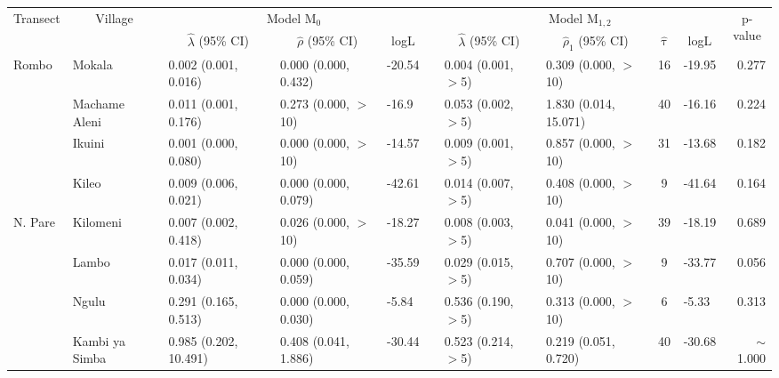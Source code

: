 \begin{tabular}{llllllllclr}
\toprule
\multicolumn{1}{c}{\multirow{2}{*}{Transect}} & \multicolumn{1}{c}{\multirow{2}{*}{Village}} & \multicolumn{3}{c}{Model M$_{0}$} & \multicolumn{1}{c}{} & \multicolumn{4}{c}{Model M$_{1,2}$} & \multicolumn{1}{c}{\multirow{2}{*}{p-value}}  \\ 
\cmidrule{3-5}\cmidrule{7-10}
\multicolumn{1}{c}{} & \multicolumn{1}{c}{} & \multicolumn{1}{c}{$\hat{\lambda}$ (95\% CI)} & \multicolumn{1}{c}{$\hat{\rho}$ (95\% CI)} & \multicolumn{1}{c}{logL} & \multicolumn{1}{c}{} & \multicolumn{1}{c}{$\hat{\lambda}$ (95\% CI)} & \multicolumn{1}{c}{$\hat{\rho}_1$ (95\% CI)} & \multicolumn{1}{c}{$\hat{\uptau}$} & \multicolumn{1}{c}{logL} & \multicolumn{1}{c}{} \\ 
\midrule
Rombo       & Mokala         & 0.002 (0.001, 0.016)   & 0.000 (0.000, 0.432)   & -20.54   & &   0.004 (0.001, $>$5)    & 0.309 (0.000, $>$10)   & 16   & -19.95  &  0.277  \\
            & Machame Aleni  & 0.011 (0.001, 0.176)   & 0.273 (0.000, $>$10)   & -16.9    & &   0.053 (0.002, $>$5)    & 1.830 (0.014, 15.071)  & 40   & -16.16  &  0.224  \\
            & Ikuini         & 0.001 (0.000, 0.080)   & 0.000 (0.000, $>$10)   & -14.57   & &   0.009 (0.001, $>$5)    & 0.857 (0.000, $>$10)   & 31   & -13.68  &  0.182  \\
            & Kileo          & 0.009 (0.006, 0.021)   & 0.000 (0.000, 0.079)   & -42.61   & &   0.014 (0.007, $>$5)    & 0.408 (0.000, $>$10)   & 9    & -41.64  &  0.164  \\
\cmidrule{2-11}
N. Pare     & Kilomeni       & 0.007 (0.002, 0.418)   & 0.026 (0.000, $>$10)   & -18.27   & &   0.008 (0.003, $>$5)    & 0.041 (0.000, $>$10)   & 39   & -18.19  &  0.689  \\
            & Lambo          & 0.017 (0.011, 0.034)   & 0.000 (0.000, 0.059)   & -35.59   & &   0.029 (0.015, $>$5)    & 0.707 (0.000, $>$10)   & 9    & -33.77  &  0.056  \\
            & Ngulu          & 0.291 (0.165, 0.513)   & 0.000 (0.000, 0.030)   & -5.84    & &   0.536 (0.190, $>$5)    & 0.313 (0.000, $>$10)   & 6    & -5.33   &  0.313  \\
            & Kambi ya Simba & 0.985 (0.202, 10.491)  & 0.408 (0.041, 1.886)   & -30.44   & &   0.523 (0.214, $>$5)    & 0.219 (0.051, 0.720)   & 40   & -30.68  &  $\sim$1.000  \\

\end{tabular}
